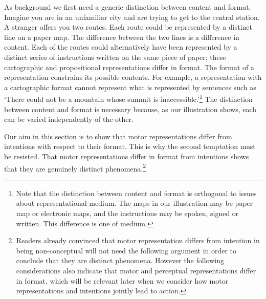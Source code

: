 \documentclass[12pt,\papersize]{extarticle}
\begin{document}
As background we first need a generic distinction between content and format. Imagine you are in an unfamiliar city and are trying to get to the central station. A stranger offers you two routes. Each route could be represented by a distinct line on a paper map. The difference between the two lines is a difference in content. Each of the routes could alternatively have been represented by a distinct series of instructions written on the same piece of paper; these cartographic and propositional representations differ in format. The format of a representation constrains its possible contents. For example, a representation with a cartographic format cannot represent what is represented by sentences such as `There could not be a mountain whose summit is inaccessible.'\footnote{Note that the distinction between content and format is orthogonal to issues about representational medium. The maps in our illustration may be paper map or electronic maps, and the instructions may be spoken, signed or written. This difference is one of medium.} The distinction between content and format is necessary because, as our illustration shows, each can be varied independently of the other.

Our aim in this section is to show that motor representations differ from intentions with respect to their format. This is why the second temptation must be resisted. That motor representations differ in format from intentions shows that they are genuinely distinct phenomena.\footnote{ Readers already convinced that motor representation differs from intention in being non-conceptual will not need the following argument in order to conclude that they are distinct phenomena. However the following considerations also indicate that motor and perceptual representations differ in format, which will be relevant later when we consider how motor representations and intentions jointly lead to action.}
\end{document}
